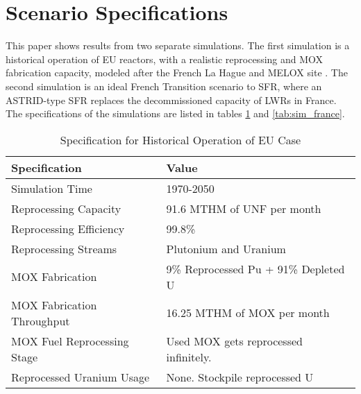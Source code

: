 \section{Scenario Specifications}
This paper shows results from two separate simulations.
The first simulation is a historical operation of \gls{EU} reactors, with a
realistic reprocessing and \gls{MOX} fabrication capacity, 
modeled after the French La Hague and MELOX site \cite{schneider_spent_2008, hugelmann_melox_1999}.
The second simulation is an ideal French Transition scenario to \gls{SFR},
where an ASTRID-type \gls{SFR} replaces the decommissioned
capacity of \glspl{LWR} in France. The specifications of the simulations
are listed in tables \ref{tab:sim_eu} and \ref{tab:sim_france}.

\begin{table}[h]
	\centering
	\begin{tabularx}{\textwidth}{bb}
		\hline
		Specification & Value \\
		\hline
		Simulation Time & 1970-2050 \\ 
		Reprocessing Capacity & 91.6 MTHM of \gls{UNF} per month \cite{schneider_spent_2008} \\
		Reprocessing Efficiency & 99.8\% \\
		Reprocessing Streams & Plutonium and Uranium \\
		\gls{MOX} Fabrication & \small{9\% Reprocessed Pu + 91\% Depleted U} \\
		\gls{MOX} Fabrication Throughput & 16.25 MTHM of \gls{MOX} per month  \cite{hugelmann_melox_1999} \\
		\gls{MOX} Fuel Reprocessing Stage &  Used \gls{MOX} gets reprocessed infinitely. \\  
		Reprocessed Uranium Usage &  None. Stockpile reprocessed U \\
		\hline
	\end{tabularx}
	\caption {Specification for Historical Operation of \gls{EU} Case}
	\label{tab:sim_eu}
\end{table}

